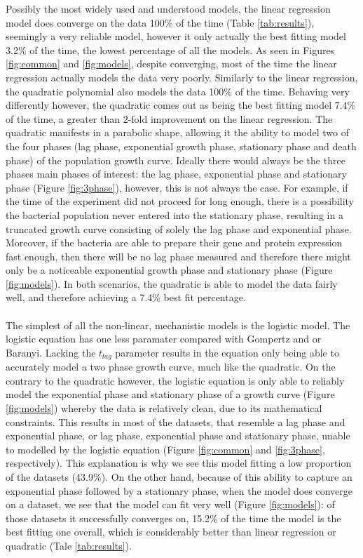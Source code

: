 \documentclass[11pt, a4paper]{article} %
\begin{document}
Possibly the most widely used and understood models, the linear regression model does converge on the data 100\% of the time (Table \ref{tab:results}), seemingly a very reliable model, however it only actually the best fitting model 3.2\% of the time, the lowest percentage of all the models. As seen in Figures \ref{fig:common} and \ref{fig:models}, despite converging, most of the time the linear regression actually models the data very poorly. Similarly to the linear regression, the quadratic polynomial also models the data 100\% of the time. Behaving very differently however, the quadratic comes out as being the best fitting model 7.4\% of the time, a greater than 2-fold improvement on the linear regression. The quadratic manifests in a parabolic shape, allowing it the ability to model two of the four phases (lag phase, exponential growth phase, stationary phase and death phase) of the population growth curve. Ideally there would always be the three phases main phases of interest: the lag phase, exponential phase and stationary phase \citep{RN106} (Figure \ref{fig:3phase}), however, this is not always the case. For example, if the time of the experiment did not proceed for long enough, there is a possibility the bacterial population never entered into the stationary phase, resulting in a truncated growth curve consisting of solely the lag phase and exponential phase. Moreover, if the bacteria are able to prepare their gene and protein expression fast enough, then there will be no lag phase measured and therefore there might only be a noticeable exponential growth phase and stationary phase (Figure \ref{fig:models}). In both scenarios, the quadratic is able to model the data fairly well, and therefore achieving a 7.4\% best fit percentage.
\paragraph{} The simplest of all the non-linear, mechanistic models is the logistic model. The logistic equation has one less paramater compared with Gompertz and or Baranyi. Lacking the $t_{lag}$ parameter results in the equation only being able to accurately model a two phase growth curve, much like the quadratic. On the contrary to the quadratic however, the logistic equation is only able to reliably model the exponential phase and stationary phase of a growth curve (Figure \ref{fig:models}) whereby the data is relatively clean, due to its mathematical constraints. This results in most of the datasets, that resemble a lag phase and exponential phase, or lag phase, exponential phase and stationary phase, unable to modelled by the logistic equation (Figure \ref{fig:common} and \ref{fig:3phase}, respectively). This explanation is why we see this model fitting a low proportion of the datasets (43.9\%). On the other hand, because of this ability to capture an exponential phase followed by a stationary phase, when the model does converge on a dataset, we see that the model can fit very well (Figure \ref{fig:models}): of those datasets it successfully converges on, 15.2\% of the time the model is the best fitting one overall, which is considerably better than linear regression or quadratic (Tale \ref{tab:results}).
\end{document}
